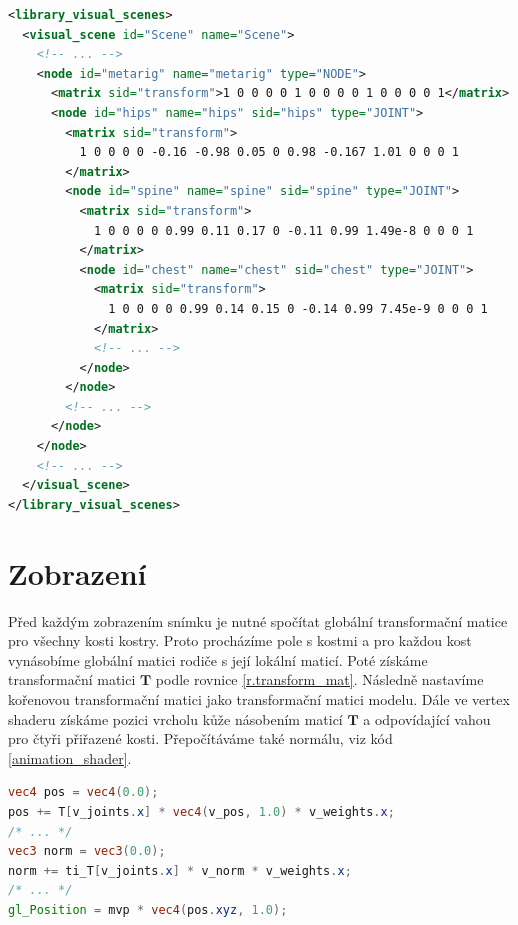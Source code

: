 \begin{lstlisting}[float,floatplacement=H,language=XML, caption={Ukázka uložení hierarchie kostry ve formátu COLLADA.}, label={collada_skeleton}]
<library_visual_scenes>
  <visual_scene id="Scene" name="Scene">
    <!-- ... -->
    <node id="metarig" name="metarig" type="NODE">
      <matrix sid="transform">1 0 0 0 0 1 0 0 0 0 1 0 0 0 0 1</matrix>
      <node id="hips" name="hips" sid="hips" type="JOINT">
        <matrix sid="transform">
          1 0 0 0 0 -0.16 -0.98 0.05 0 0.98 -0.167 1.01 0 0 0 1
        </matrix>
        <node id="spine" name="spine" sid="spine" type="JOINT">
          <matrix sid="transform">
            1 0 0 0 0 0.99 0.11 0.17 0 -0.11 0.99 1.49e-8 0 0 0 1
          </matrix>
          <node id="chest" name="chest" sid="chest" type="JOINT">
            <matrix sid="transform">
              1 0 0 0 0 0.99 0.14 0.15 0 -0.14 0.99 7.45e-9 0 0 0 1
            </matrix>
            <!-- ... -->
          </node>
        </node>
        <!-- ... -->
      </node>
    </node>
    <!-- ... -->
  </visual_scene>
</library_visual_scenes>
\end{lstlisting}

\section{Zobrazení}
Před každým zobrazením snímku je nutné spočítat globální transformační matice pro všechny kosti kostry. Proto procházíme pole s kostmi a pro každou kost vynásobíme globální matici rodiče s její lokální maticí. Poté získáme transformační matici $\mathbf{T}$ podle rovnice \ref{r.transform_mat}. Následně nastavíme kořenovou transformační matici jako transformační matici modelu. Dále ve vertex shaderu získáme pozici vrcholu kůže násobením maticí $\mathbf{T}$ a odpovídající vahou pro čtyři přiřazené kosti. Přepočítáváme také normálu, viz kód \ref{animation_shader}.

\begin{lstlisting}[float,floatplacement=H,language=GLSL, caption={Ukázka z vertex shaderu pro animovaný model. Výpočet pro pozici a normálu se provede 4krát, pro komponenty \texttt{x}, \texttt{y}, \texttt{z} a \texttt{w} vektorů \texttt{v\_weights} a \texttt{v\_joints}.}, label={animation_shader}]
vec4 pos = vec4(0.0);
pos += T[v_joints.x] * vec4(v_pos, 1.0) * v_weights.x;
/* ... */
vec3 norm = vec3(0.0);
norm += ti_T[v_joints.x] * v_norm * v_weights.x;
/* ... */
gl_Position = mvp * vec4(pos.xyz, 1.0);
\end{lstlisting}

